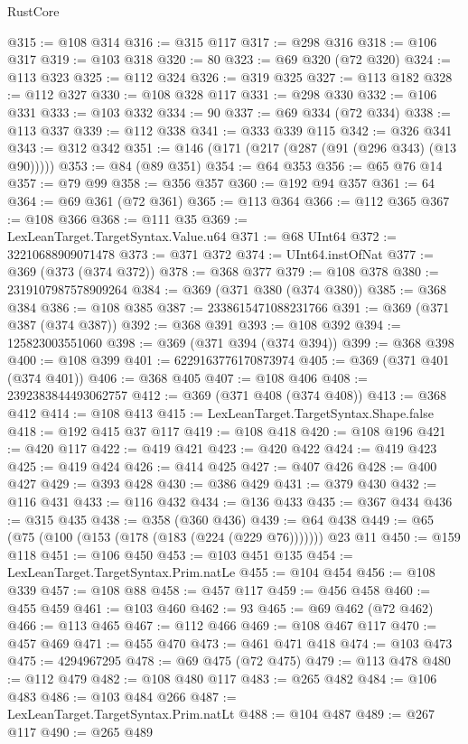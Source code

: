 \begin{lexlean}{RustCore}
\begin{coremodule}
@315 := @108 @314
@316 := @315 @117
@317 := @298 @316
@318 := @106 @317
@319 := @103 @318
@320 := 80
@323 := @69 @320 (@72 @320)
@324 := @113 @323
@325 := @112 @324
@326 := @319 @325
@327 := @113 @182
@328 := @112 @327
@330 := @108 @328 @117
@331 := @298 @330
@332 := @106 @331
@333 := @103 @332
@334 := 90
@337 := @69 @334 (@72 @334)
@338 := @113 @337
@339 := @112 @338
@341 := @333 @339 @115
@342 := @326 @341
@343 := @312 @342
@351 := @146 (@171 (@217 (@287 (@91 (@296 @343) (@13 @90)))))
@353 := @84 (@89 @351)
@354 := @64 @353
@356 := @65 @76 @14
@357 := @79 @99
@358 := @356 @357
@360 := @192 @94 @357
@361 := 64
@364 := @69 @361 (@72 @361)
@365 := @113 @364
@366 := @112 @365
@367 := @108 @366
@368 := @111 @35
@369 := LexLeanTarget.TargetSyntax.Value.u64
@371 := @68 UInt64
@372 := 32210688909071478
@373 := @371 @372
@374 := UInt64.instOfNat
@377 := @369 (@373 (@374 @372))
@378 := @368 @377
@379 := @108 @378
@380 := 2319107987578909264
@384 := @369 (@371 @380 (@374 @380))
@385 := @368 @384
@386 := @108 @385
@387 := 2338615471088231766
@391 := @369 (@371 @387 (@374 @387))
@392 := @368 @391
@393 := @108 @392
@394 := 125823003551060
@398 := @369 (@371 @394 (@374 @394))
@399 := @368 @398
@400 := @108 @399
@401 := 6229163776170873974
@405 := @369 (@371 @401 (@374 @401))
@406 := @368 @405
@407 := @108 @406
@408 := 2392383844493062757
@412 := @369 (@371 @408 (@374 @408))
@413 := @368 @412
@414 := @108 @413
@415 := LexLeanTarget.TargetSyntax.Shape.false
@418 := @192 @415 @37 @117
@419 := @108 @418
@420 := @108 @196
@421 := @420 @117
@422 := @419 @421
@423 := @420 @422
@424 := @419 @423
@425 := @419 @424
@426 := @414 @425
@427 := @407 @426
@428 := @400 @427
@429 := @393 @428
@430 := @386 @429
@431 := @379 @430
@432 := @116 @431
@433 := @116 @432
@434 := @136 @433
@435 := @367 @434
@436 := @315 @435
@438 := @358 (@360 @436)
@439 := @64 @438
@449 := @65 (@75 (@100 (@153 (@178 (@183 (@224 (@229 @76))))))) @23 @11
@450 := @159 @118
@451 := @106 @450
@453 := @103 @451 @135
@454 := LexLeanTarget.TargetSyntax.Prim.natLe
@455 := @104 @454
@456 := @108 @339
@457 := @108 @88
@458 := @457 @117
@459 := @456 @458
@460 := @455 @459
@461 := @103 @460
@462 := 93
@465 := @69 @462 (@72 @462)
@466 := @113 @465
@467 := @112 @466
@469 := @108 @467 @117
@470 := @457 @469
@471 := @455 @470
@473 := @461 @471 @418
@474 := @103 @473
@475 := 4294967295
@478 := @69 @475 (@72 @475)
@479 := @113 @478
@480 := @112 @479
@482 := @108 @480 @117
@483 := @265 @482
@484 := @106 @483
@486 := @103 @484 @266
@487 := LexLeanTarget.TargetSyntax.Prim.natLt
@488 := @104 @487
@489 := @267 @117
@490 := @265 @489

\end{coremodule}
\end{lexlean}
